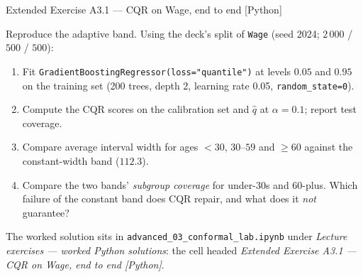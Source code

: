 \documentclass[aspectratio=169,11pt]{beamer}
\begin{document}
\begin{frame}{Extended Exercise A3.1 --- CQR on Wage, end to end [Python]}
\begin{longexercise}
  Reproduce the adaptive band. Using the deck's split of \texttt{Wage}
  (seed 2024; $2\,000$ / $500$ / $500$):
  \begin{enumerate}
    \item Fit \texttt{GradientBoostingRegressor(loss="quantile")} at levels $0.05$
          and $0.95$ on the training set (200 trees, depth 2, learning rate 0.05,
          \texttt{random\_state=0}).
    \item Compute the CQR scores on the calibration set and $\hat q$ at
          $\alpha = 0.1$; report test coverage.
    \item Compare average interval width for ages $<30$, $30$--$59$ and $\ge 60$
          against the constant-width band ($112.3$).
    \item Compare the two bands' \emph{subgroup coverage} for under-30s and 60-plus.
          Which failure of the constant band does CQR repair, and what does it
          \emph{not} guarantee?
  \end{enumerate}
\end{longexercise}
\begin{labnote}
  The worked solution sits in \texttt{advanced\_03\_conformal\_lab.ipynb} under
  \emph{Lecture exercises --- worked Python solutions}: the cell headed
  \emph{Extended Exercise A3.1 --- CQR on Wage, end to end [Python]}.
\end{labnote}
\end{frame}
\end{document}
